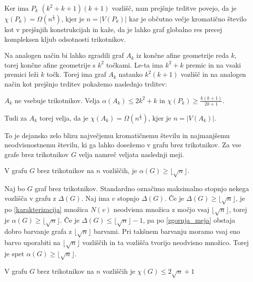 \documentclass[mat1, tisk]{fmfdelo}
\begin{document}
Ker ima $P_k$ $(k^2 + k + 1)(k + 1)$ vozlišč, nam prejšnje trditve povejo, da je $\chi(P_k) = \Omega(n^{\frac{1}{3}})$, kjer je $n = |V(P_k)|$ kar je občutno večje kromatično število kot v prejšnjih konstrukcijah in kaže, da je lahko graf globalno res precej kompleksen
kljub odsotnosti trikotnikov.

Na analogen način bi lahko zgradili graf $A_k$ iz končne afine geometrije reda $k$, torej končne afine geometrije s $k^2$ točkami. Le-ta ima $k^2 + k$ premic in na vsaki premici leži $k$ točk. Torej ima graf $A_k$ natanko $k^2(k + 1)$ vozlišč in na analogen način kot prejšnjo
trditev pokažemo naslednjo trditev:

    \begin{trditev}
        $A_k$ ne vsebuje trikotnikov. Velja $\alpha(A_k) \leq 2 k^2 + k$ in $\chi(P_k) \geq \frac{k(k + 1)}{2k + 1}$.
    \end{trditev}

Tudi za $A_k$ torej velja, da je $\chi(A_k) = \Omega(n^{\frac{1}{3}})$, kjer je $n = |V(A_k)|$.

To je dejansko zelo blizu največjemu kromatičnemu številu in najmanjšemu neodvisnostnemu številu, ki ga lahko dosežemo v grafu brez trikotnikov. Za vse grafe brez trikotnikov $G$ velja namreč veljata naslednji meji.

    \begin{trditev}
        V grafu $G$ brez trikotnikov na $n$ vozliščih, je $\alpha(G) \geq \lfloor\sqrt{n}\rfloor$.
    \end{trditev}

    \begin{dokaz}
        Naj bo $G$ graf brez trikotnikov. Standardno označimo maksimalno stopnjo nekega vozlišča v grafu z $\Delta(G)$. Naj ima $v$ stopnjo $\Delta(G)$. Če je $\Delta(G) \geq \lfloor\sqrt{n}\rfloor$, je po \ref{karakterizacija} množica $N(v)$ neodvisna množica z močjo vsaj 
        $\lfloor\sqrt{n}\rfloor$, torej je $\alpha(G) \geq \lfloor\sqrt{n}\rfloor$. Če je $\Delta(G) \leq \lfloor\sqrt{n}\rfloor - 1$, pa po \ref{zgornja_meja} obstaja dobro barvanje grafa z $\lfloor\sqrt{n}\rfloor$ barvami. Pri takšnem barvanju moramo vsaj eno barvo uporabiti
        na $\lfloor\sqrt{n}\rfloor$ vozliščih in ta vozlišča tvorijo neodvisno množico. Torej je spet $\alpha(G) \geq \lfloor\sqrt{n}\rfloor$.
    \end{dokaz}

    \begin{trditev}
        V grafu $G$ brez trikotnikov na $n$ vozliščih je $\chi(G) \leq 2\sqrt{n} + 1$
    \end{trditev}
\end{document}
